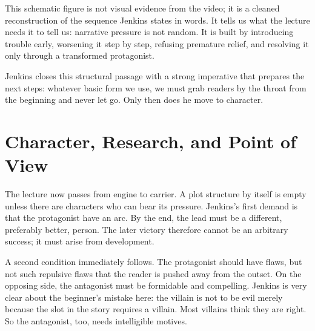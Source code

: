 \begin{figure}
\centering
{}
\end{figure}

This schematic figure is not visual evidence from the video; it is a cleaned reconstruction of the sequence Jenkins states in words. It tells us what the lecture needs it to tell us: narrative pressure is not random. It is built by introducing trouble early, worsening it step by step, refusing premature relief, and resolving it only through a transformed protagonist.

Jenkins closes this structural passage with a strong imperative that prepares the next steps: whatever basic form we use, we must grab readers by the throat from the beginning and never let go. Only then does he move to character.

\section{Character, Research, and Point of View}

The lecture now passes from engine to carrier. A plot structure by itself is empty unless there are characters who can bear its pressure. Jenkins's first demand is that the protagonist have an arc. By the end, the lead must be a different, preferably better, person. The later victory therefore cannot be an arbitrary success; it must arise from development.

A second condition immediately follows. The protagonist should have flaws, but not such repulsive flaws that the reader is pushed away from the outset. On the opposing side, the antagonist must be formidable and compelling. Jenkins is very clear about the beginner's mistake here: the villain is not to be evil merely because the slot in the story requires a villain. Most villains think they are right. So the antagonist, too, needs intelligible motives.

